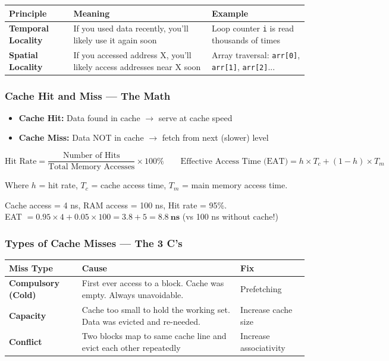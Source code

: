 \documentclass[11pt,a4paper]{article}
\newcommand{\code}[1]{\texttt{\small\colorbox{codebg}{\color{codekw}#1}}}
\newcommand{\term}[1]{\textbf{\color{darkblue}#1}}
\begin{document}
\begin{center}
\begin{tabular}{L{3.5cm} L{5cm} L{5cm}}
\toprule
\textbf{Principle} & \textbf{Meaning} & \textbf{Example} \\
\midrule
\term{Temporal Locality} & If you used data recently, you'll likely use it again soon & Loop counter \code{i} is read thousands of times \\[4pt]
\term{Spatial Locality} & If you accessed address X, you'll likely access addresses near X soon & Array traversal: \code{arr[0]}, \code{arr[1]}, \code{arr[2]}... \\
\bottomrule
\end{tabular}
\end{center}

\subsubsection{Cache Hit and Miss --- The Math}

\begin{itemize}[noitemsep]
  \item \term{Cache Hit:} Data found in cache $\to$ serve at cache speed
  \item \term{Cache Miss:} Data NOT in cache $\to$ fetch from next (slower) level
\end{itemize}

\[
\text{Hit Rate} = \frac{\text{Number of Hits}}{\text{Total Memory Accesses}} \times 100\%
\qquad
\text{Effective Access Time (EAT)} = h \times T_c + (1-h) \times T_m
\]

Where $h$ = hit rate, $T_c$ = cache access time, $T_m$ = main memory access time.

\begin{myexample}
Cache access = 4 ns, RAM access = 100 ns, Hit rate = 95\%.\\
EAT $= 0.95 \times 4 + 0.05 \times 100 = 3.8 + 5 = \mathbf{8.8\ ns}$ (vs 100 ns without cache!)
\end{myexample}

\subsubsection{Types of Cache Misses --- The 3 C's}

\begin{center}
\begin{tabular}{L{3cm} L{5.5cm} L{5.5cm}}
\toprule
\textbf{Miss Type} & \textbf{Cause} & \textbf{Fix} \\
\midrule
\term{Compulsory (Cold)} & First ever access to a block. Cache was empty. Always unavoidable. & Prefetching \\[4pt]
\term{Capacity} & Cache too small to hold the working set. Data was evicted and re-needed. & Increase cache size \\[4pt]
\term{Conflict} & Two blocks map to same cache line and evict each other repeatedly & Increase associativity \\
\bottomrule
\end{tabular}
\end{center}
\end{document}
